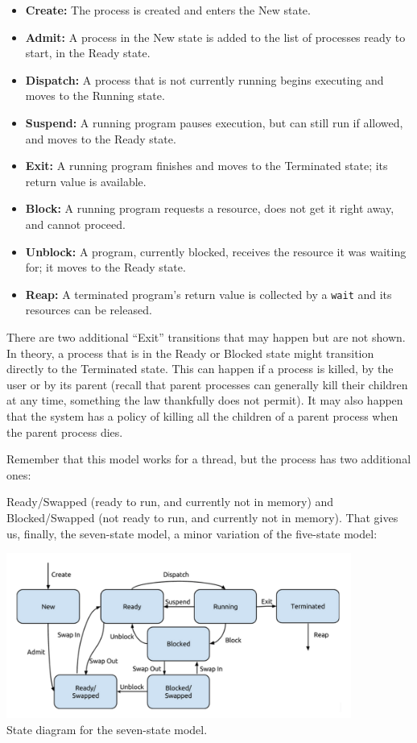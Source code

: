 \begin{itemize}
	\item \textbf{Create:} The process is created and enters the New state.
	\item \textbf{Admit:} A process in the New state is added to the list of processes ready to start, in the Ready state.
	\item \textbf{Dispatch:} A process that is not currently running begins executing and moves to the Running state.
	\item \textbf{Suspend:} A running program pauses execution, but can still run if allowed, and moves to the Ready state.
	\item \textbf{Exit:} A running program finishes and moves to the Terminated state; its return value is available.
	\item \textbf{Block:} A running program requests a resource, does not get it right away, and cannot proceed.
	\item \textbf{Unblock:} A program, currently blocked, receives the resource it was waiting for; it moves to the Ready state.
	\item \textbf{Reap:} A terminated program's return value is collected by a \texttt{wait} and its resources can be released.
\end{itemize}

There are two additional ``Exit'' transitions that may happen but are not shown. In theory, a process that is in the Ready or Blocked state might transition directly to the Terminated state. This can happen if a process is killed, by the user or by its parent (recall that parent processes can generally kill their children at any time, something the law thankfully does not permit). It may also happen that the system has a policy of killing all the children of a parent process when the parent process dies.

Remember that this model works for a thread, but the process has two additional ones:

Ready/Swapped (ready to run, and currently not in memory) and Blocked/Swapped (not ready to run, and currently not in memory). That gives us, finally, the seven-state model, a minor variation of the five-state model:

\begin{center}
	\includegraphics[width=0.85\textwidth]{images/7-state-model.png}\\
	State diagram for the seven-state model.
\end{center}

